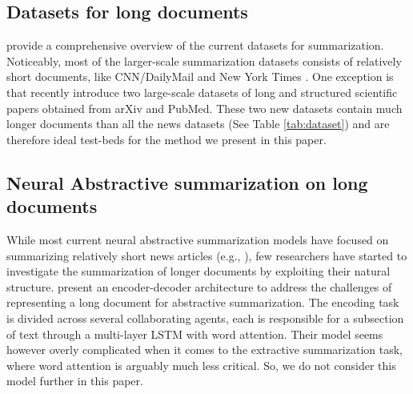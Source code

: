 \subsection{Datasets for long documents}
\begin{table}[t!]
    \centering
    \caption{Comparison of news datasets and scientific paper datasets\cite{discourse_long_document}, the length is in terms of the number of words}
    \label{tab:dataset}
\end{table}
 provide a comprehensive overview of the current  datasets for summarization. Noticeably, most of the larger-scale summarization datasets consists of relatively short documents, like CNN/DailyMail \cite{RNN_beyond} and New York Times \cite{nyt}. One exception is \cite{discourse_long_document} that recently introduce two large-scale datasets of long and structured scientific papers obtained from arXiv and PubMed. These two new datasets contain much longer documents than all the news datasets (See Table \ref{tab:dataset}) and are therefore ideal test-beds for the method we present in this paper.

\subsection{Neural Abstractive summarization on long documents}
While most current neural abstractive summarization models have focused on summarizing relatively short news articles (e.g., \cite{get_to_the_point}), few researchers have started to investigate the summarization of longer documents by exploiting their natural structure. 
 present an encoder-decoder architecture to address the challenges of representing a long document for abstractive summarization. The encoding task is divided across several collaborating agents, each is responsible for a subsection of text through a multi-layer LSTM with word attention.
Their model seems however overly complicated when it comes to the extractive summarization task, where word attention is arguably much less critical. So, we do not consider this model further in this paper. 

